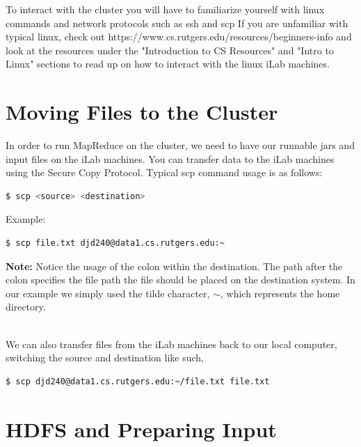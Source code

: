 \documentclass{article}
\begin{document}
\begin{info}
To interact with the cluster you will have to familiarize yourself with linux commands and network protocols such as ssh and scp If you are unfamiliar with typical linux, check out https://www.cs.rutgers.edu/resources/beginners-info and look at the resources under the "Introduction to CS Resources" and "Intro to Linux" sections to read up on how to interact with the linux iLab machines.
\end{info}



\section{Moving Files to the Cluster}
In order to run MapReduce on the cluster, we need to have our runnable jars and input files on the iLab machines. You can transfer data to the iLab machines using the Secure Copy Protocol. 
Typical scp command usage is as follows:
\begin{lstlisting}[language=bash]
  $ scp <source> <destination>
\end{lstlisting}
Example:
\begin{lstlisting}[language=bash]
  $ scp file.txt djd240@data1.cs.rutgers.edu:~
\end{lstlisting}
\textbf{Note:} Notice the usage of the colon within the destination. The path after the colon specifies the file path the file should be placed on the destination system. In our example we simply used the tilde character, $\sim$, which represents the home directory.

\-\ \\We can also transfer files from the iLab machines back to our local computer, switching the source and destination like such,
\begin{lstlisting}[language=bash]
  $ scp djd240@data1.cs.rutgers.edu:~/file.txt file.txt
\end{lstlisting}


\section{HDFS and Preparing Input}
\end{document}

